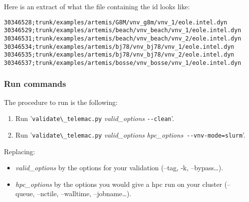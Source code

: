 Here is an extract of what the file containing the id looks like:
\begin{verbatim}
30346528;trunk/examples/artemis/G8M/vnv_g8m/vnv_1/eole.intel.dyn
30346529;trunk/examples/artemis/beach/vnv_beach/vnv_1/eole.intel.dyn
30346531;trunk/examples/artemis/beach/vnv_beach/vnv_2/eole.intel.dyn
30346534;trunk/examples/artemis/bj78/vnv_bj78/vnv_1/eole.intel.dyn
30346535;trunk/examples/artemis/bj78/vnv_bj78/vnv_2/eole.intel.dyn
30346537;trunk/examples/artemis/bosse/vnv_bosse/vnv_1/eole.intel.dyn
\end{verbatim}

\subsubsection{Run commands}

The procedure to run is the following:
\begin{enumerate}
  \item Run '\verb!validate\_telemac.py! \textit{valid\_options} \verb!--clean!'.
  \item Run '\verb!validate\_telemac.py! \textit{valid\_options} \textit{hpc\_options}\verb! --vnv-mode=slurm!'.
\end{enumerate}

Replacing:
\begin{itemize}
  \item \textit{valid\_options} by the options for your validation (--tag, -k,
    --bypass\ldots).
  \item \textit{hpc\_options} by the options you would give a hpc \telma{} run on
    your cluster (--queue, --nctile, --walltime, --jobname\ldots).
\end{itemize}
